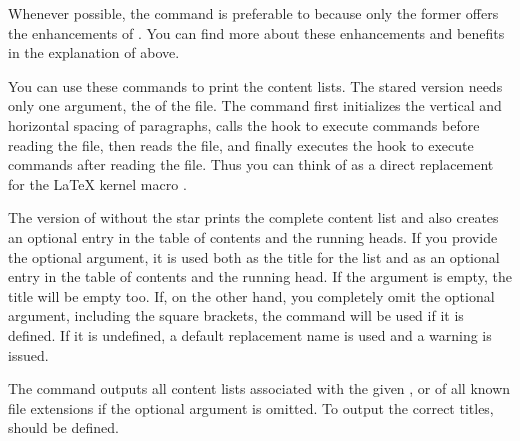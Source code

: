 Whenever possible, the
 command is preferable to
 because only the former offers the
enhancements of . You can find more
about these enhancements and benefits in the explanation of
 above.%
%
\EndIndexGroup


\begin{Declaration}
\end{Declaration}
You can use these commands to print the content lists.
The stared version  needs only
one argument, the  of the file. The command first initializes
the vertical and horizontal spacing of paragraphs, calls the hook to execute
commands before reading the file, then reads the file, and finally executes
the hook to execute commands after reading the file. Thus you can think of
 as a direct replacement for the \LaTeX{} kernel macro
.

The version of  without the star
prints the complete content list and also creates an optional entry in the
table of contents and the running heads. If you provide the optional
 argument, it is used both as the title for the list
and as an optional entry in the table of contents and the running head.
If the  argument is empty, the
title will be empty too. If, on the other hand, you completely omit the
optional argument, including the square brackets, the
 command will be used if it is defined. If
it is undefined, a default replacement name is used and a warning is issued.

The  command outputs all
content lists associated with the given , or of all known file
extensions if the optional argument is omitted. To output
the correct titles,  should be defined.

